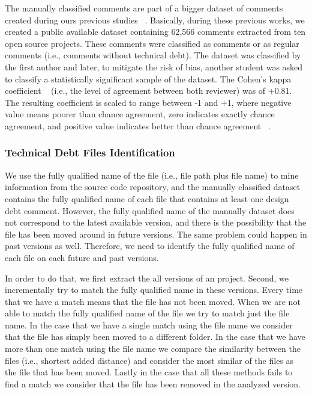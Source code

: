 The manually classified comments are part of a bigger dataset of \SATD comments created during ours previous studies ~\cite{Maldonado2015MTD,Maldonado2015TSE}. Basically, during these previous works, we created a public available dataset containing 62,566 comments extracted from ten open source projects. These comments were classified as \SATD comments or as regular comments (i.e., comments without technical debt). The dataset was classified by the first author and later, to mitigate the risk of bias, another student was asked to classify a statistically significant sample of the dataset. The Cohen's kappa coefficient ~\cite{cohen1960coefficient} (i.e., the level of agreement between both reviewer) was of +0.81. The resulting coefficient is scaled to range between -1 and +1, where negative value means poorer than chance agreement, zero indicates exactly chance agreement, and positive value indicates better than chance agreement ~\cite{fleiss1973equivalence}.

\subsubsection*{Technical Debt Files Identification}
\label{subsub:technical_debt_files_identification}

We use the fully qualified name of the file (i.e., file path plus file name) to mine information from the source code repository, and the manually classified dataset contains the fully qualified name of each file that contains at least one \SATD design debt comment. However, the fully qualified name of the manually dataset does not correspond to the latest available version, and there is the possibility that the file has been moved around in future versions. The same problem could happen in past versions as well. Therefore, we need to identify the fully qualified name of each file on each future and past versions. 

In order to do that, we first extract the all versions of an project. Second, we incrementally try to match the fully qualified name in these versions. Every time that we have a match means that the file has not been moved. When we are not able to match the fully qualified name of the file we try to match just the file name. In the case that we have a single match using the file name we consider that the file has simply been moved to a different folder. In the case that we have more than one match using the file name we compare the similarity between the files (i.e., shortest added distance) and consider the most similar of the files as the file that has been moved. Lastly in the case that all these methods fails to find a match we consider that the file has been removed in the analyzed version.  

